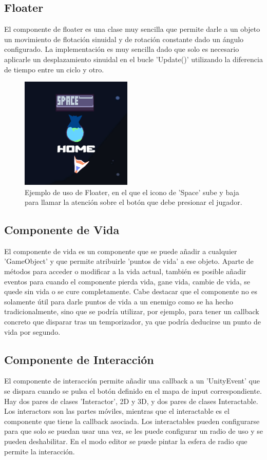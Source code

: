 \subsection{Floater}
El componente de floater es una clase muy sencilla que permite darle a un objeto un movimiento de flotación sinuidal y de rotación constante dado un ángulo configurado. La 
implementación es muy sencilla dado que solo es necesario aplicarle un desplazamiento sinuidal en el bucle 'Update()' utilizando la diferencia de tiempo entre un ciclo y otro.

\begin{figure}[H]
  \centering
    \includegraphics[width=200px,clip=true]{floaterExample.png}
  \caption{Ejemplo de uso de Floater, en el que el icono de 'Space' sube y baja para llamar la atención sobre el botón que debe presionar el jugador.}
  \label{fig:floaterExample}
\end{figure}


\subsection{Componente de Vida}
El componente de vida es un componente que se puede añadir a cualquier 'GameObject' y que permite atribuirle 'puntos de vida' a ese objeto. Aparte de métodos para acceder 
o modificar a la vida actual, también es posible añadir eventos para cuando el componente pierda vida, gane vida, cambie de vida, se quede sin vida o se cure completamente. 
Cabe destacar que el componente no es solamente útil para darle puntos de vida a un enemigo como se ha hecho tradicionalmente, sino que se podría utilizar, por ejemplo, 
para tener un callback concreto que disparar tras un temporizador, ya que podría deducirse un punto de vida por segundo.


\subsection{Componente de Interacción}
El componente de interacción permite añadir una callback a un 'UnityEvent' que se dispara cuando se pulsa el botón definido en el mapa de input correspondiente. 
Hay dos pares de clases 'Interactor', 2D y 3D, y dos pares de clases Interactable. Los interactors son las partes móviles, mientras que el interactable es el componente que 
tiene la callback asociada. Los interactables pueden configurarse para que solo se puedan usar una vez, se les puede configurar un radio de uso y se pueden deshabilitar. 
En el modo editor se puede pintar la esfera de radio que permite la interacción.

